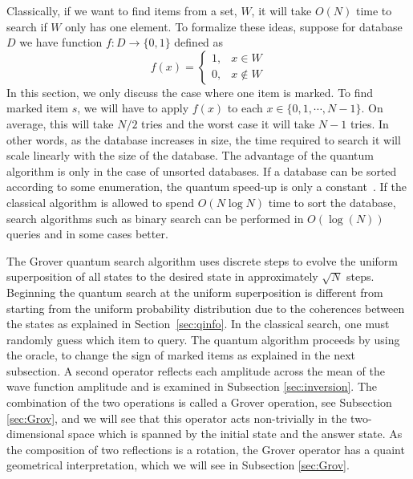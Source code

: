 \documentclass[11pt,oneside,final]{huthesis}%
\begin{document}
Classically, if we want to find items from a set, $W$, it will take $O(N)$ time to search if $W$ only has one element.  To formalize these ideas, suppose for database $D$ we have function $f:D\rightarrow\{0,1\}$ defined as
\begin{equation}
	f(x)=\left\{\begin{array}{lc} 1, & x\in W\\0, & x\notin W\end{array}\right. 
		\label{eq:oracle_func}
\end{equation}
In this section, we only discuss the case where one item is marked.   To find marked item $s$, we will have to apply $f(x)$ to each $x\in\{0,1,\cdots,N-1\}$.  On average, this will take $N/2$ tries and the worst case it will take $N-1$ tries.  In other words, as the database increases in size, the time required to search it will scale linearly with the size of the database. The advantage of the quantum algorithm is only in the case of unsorted databases.  If a database can be sorted according to some enumeration, the quantum speed-up is only a constant~\cite{Childs07}.  If the classical algorithm is allowed to spend $O(N \log N)$ time to sort the database, search algorithms such as binary search can be performed in $O(\log(N))$ queries and in some cases better. 

The Grover quantum search algorithm uses discrete steps to evolve the uniform superposition of all states to the desired state in approximately $\sqrt{N}$ steps.  Beginning the quantum search at the uniform superposition is different from starting from the uniform probability distribution due to the coherences between the states as explained in Section~\ref{sec:qinfo}.  In the classical search, one must randomly guess  which item to query.  The quantum algorithm proceeds by using the oracle,  to change the sign of marked items as explained in the next subsection. A second operator reflects each amplitude across the mean of the wave function amplitude and is examined in Subsection \ref{sec:inversion}.   The combination of the two operations is called a Grover operation, see Subsection \ref{sec:Grov}, and we will see that this operator acts non-trivially in the two-dimensional space which is spanned by the initial state and the answer state. As the composition of two reflections is a rotation, the Grover operator has a quaint geometrical interpretation, which we will see in Subsection \ref{sec:Grov}.
\end{document}
